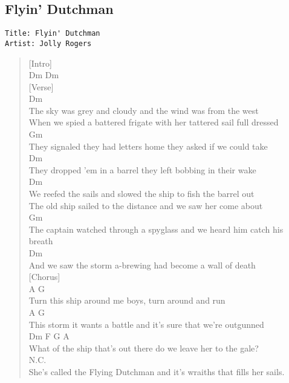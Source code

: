 \documentclass[11pt]{article}
\begin{document}
\subsection{Flyin' Dutchman}
\label{sec:org2010350}
\begin{verbatim}
Title: Flyin' Dutchman
Artist: Jolly Rogers
\end{verbatim}
\begin{verse}
[Intro]\\
Dm Dm\\
\vspace*{1em}
[Verse]\\
Dm\\
The sky was grey and cloudy and the wind was from the west\\
When we spied a battered frigate with her tattered sail full dressed\\
Gm\\
They signaled they had letters home they asked if we could take\\
Dm\\
They dropped 'em in a barrel they left bobbing in their wake\\
\vspace*{1em}
Dm\\
We reefed the sails and slowed the ship to fish the barrel out\\
The old ship sailed to the distance and we saw her come about\\
Gm\\
The captain watched through a spyglass and we heard him catch his breath\\
Dm\\
And we saw the storm a-brewing had become a wall of death\\
\vspace*{1em}
[Chorus]\\
A                              G\\
Turn this ship around me boys, turn around and run\\
A                                     G\\
This storm it wants a battle and it's sure that we're outgunned\\
Dm                       F               G                A\\
What of the ship that's out there do we leave her to the gale?\\
N.C.\\
She's called the Flying Dutchman and it's wraiths that fills her sails.\\

\end{verse}
\end{document}
